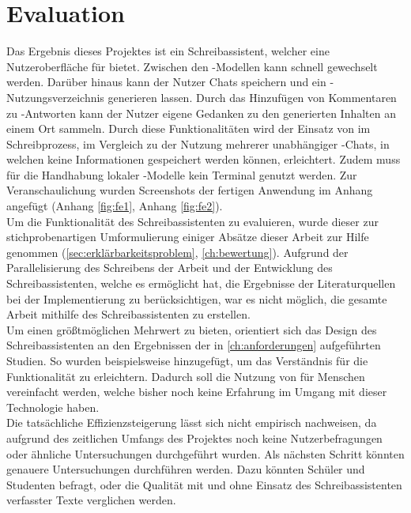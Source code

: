 \documentclass[../main.tex]{subfiles}
\begin{document}
\section{Evaluation}
Das Ergebnis dieses Projektes ist ein Schreibassistent, welcher eine Nutzeroberfläche für  bietet.
Zwischen den -Modellen kann schnell gewechselt werden. Darüber hinaus kann der Nutzer Chats speichern und ein -Nutzungsverzeichnis generieren lassen. Durch das Hinzufügen von Kommentaren 
zu -Antworten kann der Nutzer eigene Gedanken zu den generierten Inhalten an einem Ort sammeln. Durch diese Funktionalitäten wird der Einsatz von  im Schreibprozess, im Vergleich 
zu der Nutzung mehrerer unabhängiger -Chats, in welchen keine Informationen gespeichert werden können, erleichtert. Zudem muss für die Handhabung lokaler -Modelle kein Terminal genutzt werden. Zur Veranschaulichung wurden Screenshots der fertigen Anwendung im Anhang angefügt (Anhang \ref{fig:fe1}, Anhang \ref{fig:fe2}). \\ 
Um die Funktionalität des Schreibassistenten zu evaluieren, wurde dieser zur stichprobenartigen Umformulierung einiger Absätze dieser Arbeit zur Hilfe genommen (\autoref{sec:erklärbarkeitsproblem}, \autoref{ch:bewertung}). Aufgrund der Parallelisierung des Schreibens der Arbeit und der Entwicklung des Schreibassistenten, welche es ermöglicht hat, die Ergebnisse der Literaturquellen bei der 
Implementierung zu berücksichtigen, war es nicht möglich, die gesamte Arbeit mithilfe des Schreibassistenten zu erstellen. \\
Um einen größtmöglichen Mehrwert zu bieten, orientiert sich das Design des Schreibassistenten an den Ergebnissen der in \autoref{ch:anforderungen} aufgeführten Studien. So wurden beispielsweise 
 hinzugefügt, um das Verständnis für die Funktionalität zu erleichtern. Dadurch soll die Nutzung von  für Menschen vereinfacht werden, welche bisher noch keine Erfahrung im 
Umgang mit dieser Technologie haben.\\
Die tatsächliche Effizienzsteigerung lässt sich nicht empirisch nachweisen, da aufgrund des zeitlichen Umfangs des Projektes noch keine Nutzerbefragungen oder ähnliche Untersuchungen durchgeführt 
wurden. Als nächsten Schritt könnten genauere Untersuchungen durchführen werden. Dazu könnten Schüler und Studenten befragt, oder die Qualität mit und ohne 
Einsatz des Schreibassistenten verfasster Texte verglichen werden.\\ 
\end{document}
